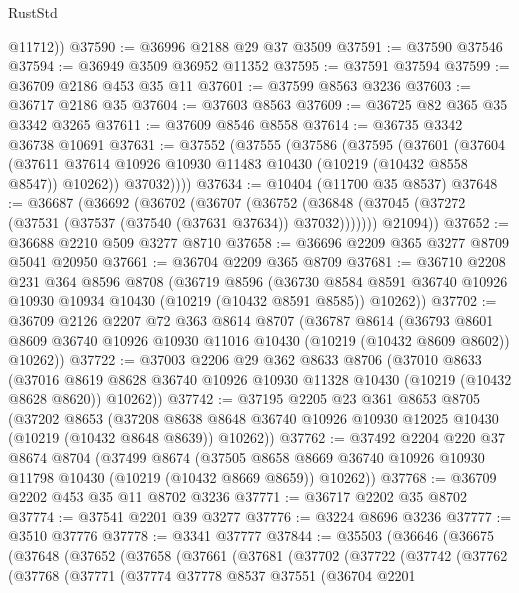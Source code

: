 \begin{lexlean}{RustStd}
\begin{coremodule}
        @11712))
@37590 := @36996 @2188 @29 @37 @3509
@37591 := @37590 @37546
@37594 := @36949 @3509 @36952 @11352
@37595 := @37591 @37594
@37599 := @36709 @2186 @453 @35 @11
@37601 := @37599 @8563 @3236
@37603 := @36717 @2186 @35
@37604 := @37603 @8563
@37609 := @36725 @82 @365 @35 @3342 @3265
@37611 := @37609 @8546 @8558
@37614 := @36735 @3342 @36738 @10691
@37631 := @37552
    (@37555
      (@37586
        (@37595
          (@37601
            (@37604
              (@37611 @37614 @10926 @10930 @11483 @10430 (@10219 (@10432 @8558 @8547)) @10262))
            @37032))))
@37634 := @10404 (@11700 @35 @8537)
@37648 := @36687
    (@36692
      (@36702
        (@36707
          (@36752 (@36848 (@37045 (@37272 (@37531 (@37537 (@37540 (@37631 @37634)) @37032)))))))
        @21094))
@37652 := @36688 @2210 @509 @3277 @8710
@37658 := @36696 @2209 @365 @3277 @8709 @5041 @20950
@37661 := @36704 @2209 @365 @8709
@37681 := @36710
    @2208
    @231
    @364
    @8596
    @8708
    (@36719
      @8596
      (@36730 @8584 @8591 @36740 @10926 @10930 @10934 @10430 (@10219 (@10432 @8591 @8585)) @10262))
@37702 := @36709
    @2126
    @2207
    @72
    @363
    @8614
    @8707
    (@36787
      @8614
      (@36793 @8601 @8609 @36740 @10926 @10930 @11016 @10430 (@10219 (@10432 @8609 @8602)) @10262))
@37722 := @37003
    @2206
    @29
    @362
    @8633
    @8706
    (@37010
      @8633
      (@37016 @8619 @8628 @36740 @10926 @10930 @11328 @10430 (@10219 (@10432 @8628 @8620)) @10262))
@37742 := @37195
    @2205
    @23
    @361
    @8653
    @8705
    (@37202
      @8653
      (@37208 @8638 @8648 @36740 @10926 @10930 @12025 @10430 (@10219 (@10432 @8648 @8639)) @10262))
@37762 := @37492
    @2204
    @220
    @37
    @8674
    @8704
    (@37499
      @8674
      (@37505 @8658 @8669 @36740 @10926 @10930 @11798 @10430 (@10219 (@10432 @8669 @8659)) @10262))
@37768 := @36709 @2202 @453 @35 @11 @8702 @3236
@37771 := @36717 @2202 @35 @8702
@37774 := @37541 @2201 @39 @3277
@37776 := @3224 @8696 @3236
@37777 := @3510 @37776
@37778 := @3341 @37777
@37844 := @35503
    (@36646
      (@36675
        (@37648
          (@37652
            (@37658
              (@37661
                (@37681
                  (@37702
                    (@37722
                      (@37742
                        (@37762
                          (@37768
                            (@37771
                              (@37774
                                @37778
                                @8537
                                @37551
                                (@36704
                                  @2201

\end{coremodule}
\end{lexlean}
